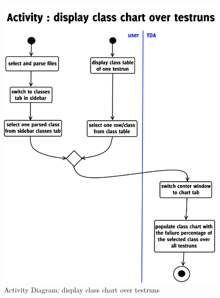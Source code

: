 \begin{figure}[h]
\begin{center}
\includegraphics[scale=0.3]{pics/activityDisplayClassChartOverTestruns.png}
\caption{Activity Diagram: display class chart over testruns} 
\label{AD-DCCoTR}
\end{center}
\end{figure}
\ \\